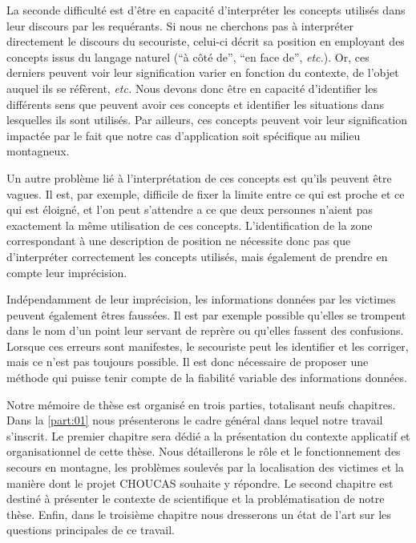 La seconde difficulté est d'être en capacité d'interpréter les
concepts utilisés dans leur discours par les requérants. Si nous ne
cherchons pas à interpréter directement le discours du secouriste,
celui-ci décrit sa position en employant des concepts issus du langage
naturel (\eg \enquote{à côté de}, \enquote{en face de},
\emph{etc.}). Or, ces derniers peuvent voir leur signification varier
en fonction du contexte, de l'objet auquel ils se réfèrent,
\emph{etc.}  Nous devons donc être en capacité d'identifier les
différents sens que peuvent avoir ces concepts et identifier les
situations dans lesquelles ils sont utilisés. Par ailleurs, ces
concepts peuvent voir leur signification impactée par le fait que
notre cas d’application soit spécifique au milieu montagneux.

Un autre problème lié à l'interprétation de ces concepts est qu'ils
peuvent être vagues.  Il est, par exemple, difficile de fixer la
limite entre ce qui est proche et ce qui est éloigné, et l'on peut
s'attendre a ce que deux personnes n'aient pas exactement la même
utilisation de ces concepts. L’identification de la zone correspondant
à une description de position ne nécessite donc pas que d'interpréter
correctement les concepts utilisés, mais également de prendre en
compte leur imprécision.

Indépendamment de leur imprécision, les informations données par les
victimes peuvent également êtres faussées. Il est par exemple possible
qu'elles se trompent dans le nom d'un point leur servant de reprère ou
qu'elles fassent des confusions. Lorsque ces erreurs sont manifestes,
le secouriste peut les identifier et les corriger, mais ce n'est pas
toujours possible. Il est donc nécessaire de proposer une méthode qui
puisse tenir compte de la fiabilité variable des informations données.



Notre mémoire de thèse est organisé en trois parties, totalisant neufs
chapitres. Dans la \autoref{part:01} nous présenterons le cadre
général dans lequel notre travail s'inscrit. Le premier chapitre sera
dédié a la présentation du contexte applicatif et organisationnel de
cette thèse. Nous détaillerons le rôle et le fonctionnement des
secours en montagne, les problèmes soulevés par la localisation des
victimes et la manière dont le projet CHOUCAS souhaite y répondre. Le
second chapitre est destiné à présenter le contexte de scientifique et
la problématisation de notre thèse. Enfin, dans le troisième chapitre
nous dresserons un état de l'art sur les questions principales de ce
travail.

